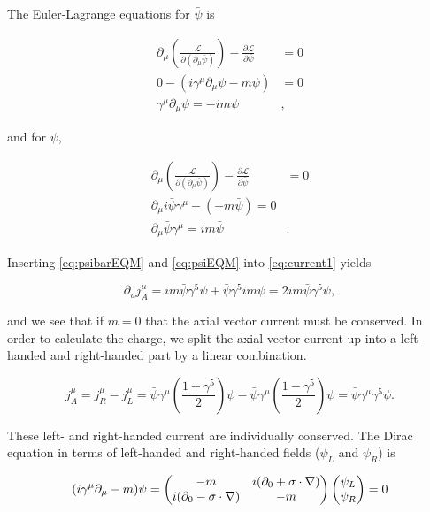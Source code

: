 \documentclass[11pt, a4paper]{amsart}
\begin{document}
The Euler-Lagrange equations for $\bar{\psi}$ is

\begin{align}
\partial_\mu \left(\frac{\mathcal{L}}{\partial (\partial_\mu \bar{\psi})} \right) - \frac{\partial \mathcal{L}}{\partial \bar{\psi}} &= 0 \\
0 - (i\gamma^\mu\partial_\mu\psi - m \psi) &= 0	\\
\gamma^\mu\partial_\mu \psi = -im\psi& \label{eq:psibarEQM},
\end{align}

and for $\psi$,

\begin{align}
\partial_\mu \left(\frac{\mathcal{L}}{\partial (\partial_\mu \bar{\psi})} \right) - \frac{\partial \mathcal{L}}{\partial \bar{\psi}} &= 0 \\
\partial_\mu i\bar{\psi} \gamma^\mu - (-m\bar{\psi}) = 0 \\
\partial_\mu \bar{\psi} \gamma^\mu = im\bar{\psi}& \label{eq:psiEQM}.
\end{align}

Inserting \autoref{eq:psibarEQM} and \autoref{eq:psiEQM} into \autoref{eq:current1} yields

\begin{equation}
\partial_u j^\mu_A = im\bar{\psi}\gamma^5\psi + \bar{\psi}\gamma^5 im \psi = 2im\bar{\psi}\gamma^5 \psi,
\end{equation}

and we see that if $m=0$ that the axial vector current  must be conserved. In order to calculate the charge, we split the axial vector current up into a left-handed and right-handed part by a linear combination.

\begin{equation}
\label{eq:rightandleftcurrent}
j_A^\mu = j_R^\mu - j_L^\mu = \bar{\psi} \gamma^\mu\left(\frac{1 + \gamma^5}{2} \right)\psi - \bar{\psi} \gamma^\mu \left( \frac{1 - \gamma^5}{2}\right) \psi = \bar{\psi}\gamma^\mu\gamma^5\psi.
\end{equation}

These left- and right-handed current are individually  conserved. The Dirac equation in terms of left-handed and right-handed fields ($\psi_L$ and $\psi_R$) is

\begin{equation}
(i\gamma^\mu \partial_\mu - m ) \psi = \begin{pmatrix}
-m & i(\partial_0 + \vb{\sigma} \cdot \nabla) \\
i(\partial_0 - \vb{\sigma} \cdot \nabla) & -m
\end{pmatrix}
\begin{pmatrix}
\psi_L \\ \psi_R
\end{pmatrix}
= 0 
\end{equation}
\end{document}
